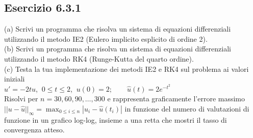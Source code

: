 \documentclass[letterpaper, 12pt]{article}
\numberwithin{equation}{section}    %
\begin{document}
\subsection{Esercizio 6.3.1}
(a) Scrivi un programma che risolva un sistema di equazioni differenziali utilizzando il metodo IE2 
(Eulero implicito esplicito di ordine 2).\\
(b) Scrivi un programma che risolva un sistema di equazioni differenziali utilizzando il metodo RK4 
(Runge-Kutta del quarto ordine).\\
(c) Testa la tua implementazione dei metodi IE2 e RK4 sul problema ai valori iniziali\\

$u' = -2t u$, $\ 0 \le t \le 2$, $\ u(0) = 2; \qquad \hat{u}(t) = 2e^{-t^2}$ \\

Risolvi per $n=30,60,90,\ldots,300$ e rappresenta graficamente l'errore massimo 
$||u-\hat{u}||_\infty=\max_{0\leq i\leq n} |u_i-\hat{u}(t_i)|$ in funzione del numero di valutazioni 
di funzione in un grafico log-log, insieme a una retta che mostri il tasso di convergenza atteso.
\end{document}
